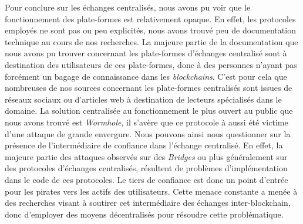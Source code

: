 Pour conclure sur les échanges centralisés, nous avons pu voir que le fonctionnement des plate-formes est relativement opaque. 
En effet, les protocoles employés ne sont pas ou peu explicités, nous avons trouvé peu de documentation technique au cours de nos recherches. 
La majeure partie de la documentation que nous avons pu trouver concernant les plate-formes d'échanges centralisé sont à destination des utilisateurs de ces plate-formes, donc à des personnes n'ayant pas forcément un bagage de connaissance dans les \textit{\gls{blockchain}s}. 
C'est pour cela que nombreuses de nos sources concernant les plate-formes centralisés sont issues de réseaux sociaux ou d'articles web à destination de lecteurs spécialisés dans le domaine. 
La solution centralisée au fonctionnement le plus ouvert au public que nous avons trouvé est \textit{Wormhole}, il s'avère que ce protocole à aussi été victime d'une attaque de grande envergure. 
Nous pouvons ainsi nous questionner sur la présence de l'intermédiaire de confiance dans l'échange centralisé. 
En effet, la majeure partie des attaques observés sur des \textit{Bridges} ou plus généralement sur des protocoles d'échanges centralisés, résultent de problèmes d'implémentation dans le code de ces protocoles. 
Le tiers de confiance est donc un point d'entrée pour les pirates vers les \gls{actif}s des utilisateurs. 
Cette menace constante a menée à des recherches visant à soutirer cet intermédiaire des échanges inter-\gls{blockchain}, donc d'employer des moyens décentralisés pour résoudre cette problématique. 